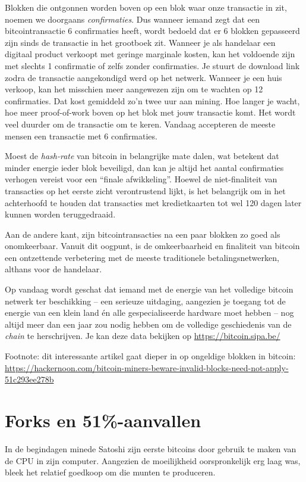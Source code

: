 \documentclass[smalldemyvopaper,11pt,twoside,onecolumn,openright,extrafontsizes]{memoir}
\begin{document}
Blokken die ontgonnen worden boven op een blok waar onze transactie in zit, noemen we doorgaans \textit{confirmaties}. Dus wanneer iemand zegt dat een bitcointransactie 6 confirmaties heeft, wordt bedoeld dat er 6 blokken gepasseerd zijn sinds de transactie in het grootboek zit. Wanneer je als handelaar een digitaal product verkoopt met geringe marginale kosten, kan het voldoende zijn met slechts 1 confirmatie of zelfs zonder confirmaties. Je stuurt de download link zodra de transactie aangekondigd werd op het netwerk. Wanneer je een huis verkoop, kan het misschien meer aangewezen zijn om te wachten op 12 confirmaties. Dat kost gemiddeld zo’n twee uur aan mining. Hoe langer je wacht, hoe meer proof-of-work boven op het blok met jouw transactie komt. Het wordt veel duurder om de transactie om te keren. Vandaag accepteren de meeste mensen een transactie met 6 confirmaties.

Moest de \textit{hash-rate} van bitcoin in belangrijke mate dalen, wat betekent dat minder energie ieder blok beveiligd, dan kan je altijd het aantal confirmaties verhogen vereist voor een “finale afwikkeling”. Hoewel de niet-finaliteit van transacties op het eerste zicht verontrustend lijkt, is het belangrijk om in het achterhoofd te houden dat transacties met kredietkaarten tot wel 120 dagen later kunnen worden teruggedraaid.

Aan de andere kant, zijn bitcointransacties na een paar blokken zo goed als onomkeerbaar. Vanuit dit oogpunt, is de omkeerbaarheid en finaliteit van bitcoin een ontzettende verbetering met de meeste traditionele betalingsnetwerken, althans voor de handelaar.

Op vandaag wordt geschat dat iemand met de energie van het volledige bitcoin netwerk ter beschikking – een serieuze uitdaging, aangezien je toegang tot de energie van een klein land én alle gespecialiseerde hardware moet hebben – nog altijd meer dan een jaar zou nodig hebben om de volledige geschiedenis van de \textit{chain} te herschrijven. Je kan deze data bekijken op \href{ https://bitcoin.sipa.be/}{ https://bitcoin.sipa.be/}

Footnote: dit interessante artikel gaat dieper in op ongeldige blokken in bitcoin: \href{ https://hackernoon.com/bitcoin-miners-beware-invalid-blocks-need-not-apply-51c293ee278b }{ https://hackernoon.com/bitcoin-miners-beware-invalid-blocks-need-not-apply-51c293ee278b }

\chapter{Forks en 51\%-aanvallen}
In de begindagen minede Satoshi zijn eerste bitcoins door gebruik te maken van de CPU in zijn computer. Aangezien de moeilijkheid oorspronkelijk erg laag was, bleek het relatief goedkoop om die munten te produceren.
\end{document}
